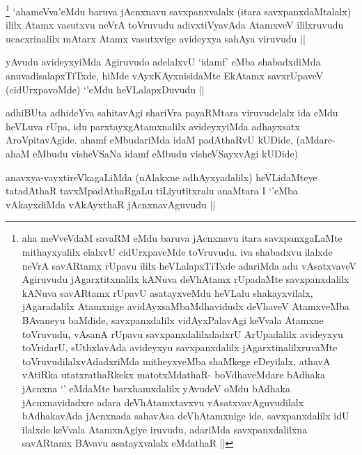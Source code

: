 \begin{artha}
\footnote{aha meVveVdaM savaRM eMdu baruva jAcnxnavu itara savxpanxgaLaMte mithayxyalilx elalxvU cidUrxpaveMde toVruvudu. iva shabadxvu ilalxde neVrA savARtamx rUpavu ililx heVLalapxTiTxde adariMda adu vAsatxvaveV Agiruvudu jAgarxtitxnalilx kANuva deVhAtamx rUpadaMte savxpanxdalilx kANuva savARtamx rUpavU asatayxveMdu heVLalu shakayxvilalx, jAgaradalilx Atamxnige avidAyxsaMbaMdhavidudx deVhaveV AtamxveMba BAvaneyu baMdide, savxpanxdalilx vidAyxPalavAgi keVvala Atamxne toVruvudu, vAsanA rUpavu savxpanxdalilxdadxrU ArUpadalilx avideyxyu toVridarU, sUthxlavAda avideyxyu savxpanxdalilx jAgarxtinalilxruvaMte toVruvudilalxvAdadxriMda mitheyxyeMba shaMkege eDeyilalx, athavA vAtiRka utatxrathaRkekx matotxMdathaR- boVdhaveMdare bAdhaka jAcnxna `\stext' eMdaMte barxhamxdalilx yAvudeV oMdu bAdhaka jAcnxnavidadxre adara deVhAtamxtavxvu vAsatxvavAguvudilalx bAdhakavAda jAcnxnada sahavAsa deVhAtamxnige ide, savxpanxdalilx idU ilalxde keVvala AtamxnAgiye iruvudu, adariMda savxpanxdalilxna savARtamx BAvavu asatayxvalalx eMdathaR ||} `ahameVva'eMdu baruva jAcnxnavu savxpanxvalalx (itara savxpanxdaMtalalx) ililx Atamx vasutxvu neVrA toVruvudu adivxtiVyavAda AtamxveV ililxruvudu ucacxrinalilx mAtarx Atamx vasutxvige avideyxya sahAya viruvudu ||
\end{artha}


\begin{artha}
yAvudu avideyxyiMda Agiruvudo adelalxvU `idamf' eMba shabadxdiMda anuvadisalapxTiTxde, hiMde vAyxKAyxnisidaMte EkAtamx savxrUpaveV (cidUrxpavoMde) `\stext'eMdu heVLalapxDuvudu ||
\end{artha}


\begin{artha}
adhiBUta adhideYva sahitavAgi shariVra payaRMtara viruvudelalx ida eMdu heVLuva rUpa, idu parxtayxgAtamxnalilx avideyxyiMda adhayxsatx AroVpitavAgide. ahamf eMbudariMda idaM padAthaRvU kUDide, (aMdare-ahaM eMbudu visheVSaNa idamf eMbudu visheVSayxvAgi kUDide)
\end{artha}


\begin{artha}
anavxya-vayxtireVkagaLiMda (nAlakxne adhAyxyadalilx) heVLidaMteye tatadAthaR tavxMpadAthaRgaLu tiLiyutitxralu anaMtara I `\stext'eMba vAkayxdiMda vAkAyxthaR jAcnxnavAguvudu ||
\end{artha}

